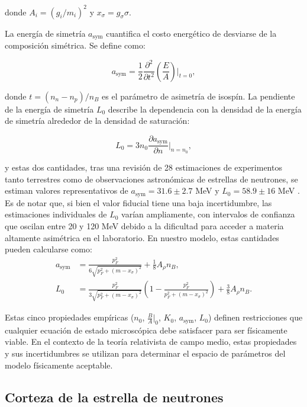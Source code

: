 donde $A_i = (g_i/m_i)^2$ y $x_\sigma = g_\sigma \sigma$. 

La energía de simetría $a_\text{sym}$ cuantifica el costo energético de desviarse de la composición simétrica. Se define como:

\begin{equation*}
	a_\text{sym} = \frac{1}{2} \frac{\partial^2}{\partial t^2}\left(\frac{E}{A}\right)\bigg|_{t=0},
\end{equation*}

donde $t = (n_n - n_p)/n_B$ es el parámetro de asimetría de isospín. La pendiente de la energía de simetría $L_0$ describe la dependencia con la densidad de la energía de simetría alrededor de la densidad de saturación:

\begin{equation*}
	L_0 = 3n_0 \frac{\partial a_\text{sym}}{\partial n}\bigg|_{n=n_0},
\end{equation*}

y estas dos cantidades, tras una revisión de 28 estimaciones de experimentos tanto terrestres como de observaciones astronómicas de estrellas de neutrones, se estiman valores representativos de $a_\text{sym} = 31.6 \pm 2.7$ MeV y $L_0 = 58.9 \pm 16$ MeV \cite{kumarTheoreticalExperimentalConstraints2024, liUnderstandingAstrophysicalEffects2019}. Es de notar que, si bien el valor fiducial tiene una baja incertidumbre, las estimaciones individuales de $L_0$ varían ampliamente, con intervalos de confianza que oscilan entre 20 y 120 MeV debido a la dificultad para acceder a materia altamente asimétrica en el laboratorio. En nuestro modelo, estas cantidades pueden calcularse como:
\vspace{-6pt}
\begin{align}
	a_\text{sym} &= \frac{p_F^2}{6\sqrt{p_F^2 + (m-x_\sigma)^2}} + \frac{1}{8}A_\rho n_B, \label{eq:energia_simetria} \\
	L_0 &= \frac{p_F^2}{3\sqrt{p_F^2 + (m-x_\sigma)^2}}\left(1 - \frac{p_F^2}{p_F^2 + (m-x_\sigma)^2}\right) + \frac{3}{8}A_\rho n_B. \label{eq:pendiente_simetria}
\end{align}

Estas cinco propiedades empíricas ($n_0$, $\frac{B}{A}\big|_0$, $K_0$, $a_\text{sym}$, $L_0$) definen restricciones que cualquier ecuación de estado microscópica debe satisfacer para ser físicamente viable. En el contexto de la teoría relativista de campo medio, estas propiedades y sus incertidumbres se utilizan para determinar el espacio de parámetros del modelo físicamente aceptable.

\subsection{Corteza de la estrella de neutrones}